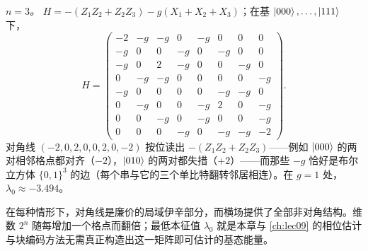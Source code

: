 \begin{remark}[$n=1,2,3$ 时写出的伊辛哈密顿量]
\emph{$n=3$。} $H=-(Z_1Z_2+Z_2Z_3)-g(X_1+X_2+X_3)$；在基
$\ket{000},\dots,\ket{111}$ 下，
\[
  H=\begin{pmatrix}
    -2&-g&-g&0&-g&0&0&0\\
    -g&0&0&-g&0&-g&0&0\\
    -g&0&2&-g&0&0&-g&0\\
    0&-g&-g&0&0&0&0&-g\\
    -g&0&0&0&0&-g&-g&0\\
    0&-g&0&0&-g&2&0&-g\\
    0&0&-g&0&-g&0&0&-g\\
    0&0&0&-g&0&-g&-g&-2
  \end{pmatrix}.
\]
对角线 $(-2,0,2,0,0,2,0,-2)$ 按位读出 $-(Z_1Z_2+Z_2Z_3)$——例如
$\ket{000}$ 的两对相邻格点都对齐（$-2$），$\ket{010}$ 的两对都失措（$+2$）——而那些 $-g$ 恰好是布尔立方体 $\{0,1\}^3$ 的边（每个串与它的三个单比特翻转邻居相连）。在 $g=1$ 处，
$\lambda_0\approx-3.494$。

在每种情形下，对角线是廉价的局域伊辛部分，而横场提供了全部非对角结构。维数 $2^n$ 随每增加一个格点而翻倍；最低本征值 $\lambda_0$ 就是本章与 \cref{ch:lec09} 的相位估计与块编码方法无需真正构造出这一矩阵即可估计的基态能量。
\end{remark}

